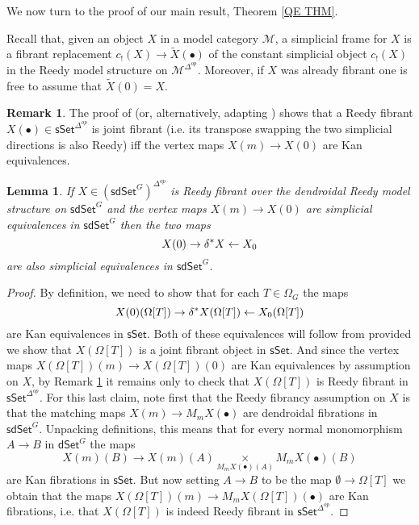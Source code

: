 \documentclass[a4paper,10pt
,draft
]{article}%
\numberwithin{equation}{section}
\numberwithin{figure}{section}
\newtheorem{lemma}[equation]{Lemma}%
\theoremstyle{definition} %
\newtheorem{remark}[equation]{Remark}%
\newcommand{\1}{\ensuremath{\mathbbm 1}}%
\begin{document}
We now turn to the proof of our main result,
Theorem \ref{QE THM}.


Recall that, given an object $X$ in a model category $\mathcal{M}$,
a simplicial frame for $X$ is a fibrant replacement
$c_!(X) \to \widetilde{X}(\bullet)$ of the constant 
simplicial object $c_!(X)$ in the Reedy model structure on $\mathcal{M}^{\Delta^{op}}$.
Moreover, if $X$ was already fibrant one is free to assume that $\widetilde{X}(0) = X$.

\begin{remark}\label{JOINTFIB REM}
	The proof of \cite[Prop. 4.5(ii)]{BP_edss}
	(or, alternatively, adapting \cite[Prop. 4.24(ii)]{BP_edss})
	shows that a Reedy fibrant $X(\bullet) \in \mathsf{sSet}^{\Delta^{op}}$
	is joint fibrant (i.e. its transpose swapping the two simplicial directions is also Reedy)
	iff the vertex maps $X(m) \to X(0)$
	are Kan equivalences.
\end{remark}

\begin{lemma}\label{DIAGWE LEM}
If $X \in (\mathsf{sdSet}^G)^{\Delta^{op}}$ is
Reedy fibrant 
over the dendroidal Reedy model structure 
on $\mathsf{sdSet}^G$
and the vertex maps 
$X(m) \to X(0)$ are simplicial equivalences in $\mathsf{sdSet}^G$
then the two maps
\[
X(0) \to \delta^{\**} X \leftarrow X_0
\]
are also simplicial equivalences in $\mathsf{sdSet}^G$.
\end{lemma}

\begin{proof}
By definition,
we need to show that for each $T \in \Omega_G$ the maps 
\[
	X(0)(\Omega[T]) \to 
	\delta^{\**} X (\Omega[T]) \leftarrow
	X_0 (\Omega[T])
\]	
are Kan equivalences in $\mathsf{sSet}$.
Both of these equivalences will follow from 
\cite[Prop. 4.5(iv)]{BP_edss}
provided we show that
$X(\Omega[T])$ is a joint fibrant object in $\mathsf{sSet}$.
And since the vertex maps 
$X(\Omega[T])(m) \to X(\Omega[T])(0)$
are Kan equivalences by assumption on $X$,
by Remark \ref{JOINTFIB REM} it remains only to check that
$X(\Omega[T])$
is Reedy fibrant in $\mathsf{sSet}^{\Delta^{op}}$.
For this last claim, 
note first that the Reedy fibrancy 
assumption on $X$ is that the matching maps 
$X(m) \to M_m X(\bullet)$
are dendroidal fibrations in 
$\mathsf{sdSet}^G$.
Unpacking definitions,
this means that for every normal monomorphism 
$A \to B$ in $\mathsf{dSet}^G$ the maps
\[
X(m)(B) \to 
X(m)(A) \underset{{M_m X(\bullet)(A)}}{\times} M_m X(\bullet)(B)
\]
are Kan fibrations in $\mathsf{sSet}$.
But now setting $A \to B$ to be the map $\emptyset \to \Omega[T]$
we obtain that the maps
$X(\Omega[T])(m) \to 
M_m X(\Omega[T])(\bullet)$
are Kan fibrations, i.e. that 
$X(\Omega[T])$ is indeed Reedy fibrant
in $\mathsf{sSet}^{\Delta^{op}}$.
\end{proof}
\end{document}
